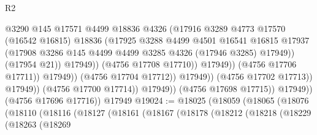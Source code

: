 \begin{lexlean}{R2}
\begin{coremodule}
                                              @3290
                                              @145
                                              @17571
                                              @4499
                                              @18836
                                              @4326
                                              (@17916
                                                @3289
                                                @4773
                                                @17570
                                                (@16542 @16815)
                                                @18836
                                                (@17925
                                                  @3288
                                                  @4499
                                                  @4501
                                                  @16541
                                                  @16815
                                                  @17937
                                                  (@17908
                                                    @3286
                                                    @145
                                                    @4499
                                                    @4499
                                                    @3285
                                                    @4326
                                                    (@17946 @3285)
                                                    @17949))
                                                (@17954 @21))
                                              @17949))
                                          (@4756 @17708 @17710))
                                        @17949))
                                    (@4756 @17706 @17711))
                                  @17949))
                              (@4756 @17704 @17712))
                            @17949))
                        (@4756 @17702 @17713))
                      @17949))
                  (@4756 @17700 @17714))
                @17949))
            (@4756 @17698 @17715))
          @17949))
      (@4756 @17696 @17716))
    @17949
@19024 := @18025
    (@18059
      (@18065
        (@18076
          (@18110
            (@18116
              (@18127
                (@18161
                  (@18167
                    (@18178
                      (@18212
                        (@18218
                          (@18229
                            (@18263
                              (@18269

\end{coremodule}
\end{lexlean}
